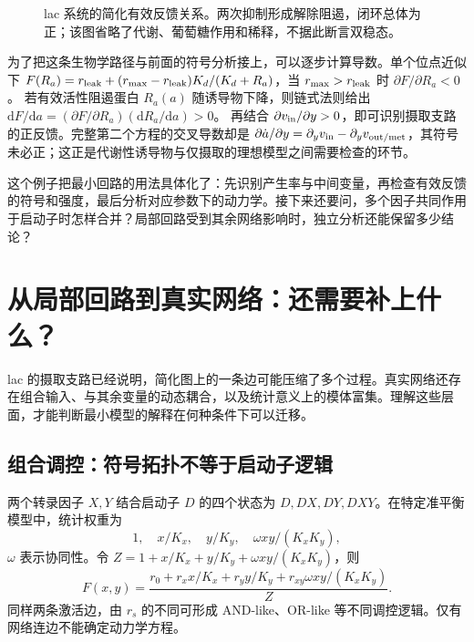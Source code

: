 \documentclass[11pt,a4paper,UTF8,fontset=fandol]{ctexart}
\newcommand{\dd}{\mathrm d}\newcommand{\R}{\mathbb R}\newcommand{\ssv}{\mathrm{ss}}
\begin{document}
\begin{figure}[H]\centering
{}
\caption{lac 系统的简化有效反馈关系。两次抑制形成解除阻遏，闭环总体为正；该图省略了代谢、葡萄糖作用和稀释，不据此断言双稳态。}
\end{figure}

为了把这条生物学路径与前面的符号分析接上，可以逐步计算导数。单个位点近似下 $F(R_a)=r_{\rm leak}+(r_{\rm max}-r_{\rm leak})K_d/(K_d+R_a)$，当 $r_{\rm max}>r_{\rm leak}$ 时 $\partial F/\partial R_a<0$。
若有效活性阻遏蛋白 $R_a(a)$ 随诱导物下降，则链式法则给出 $\dd F/\dd a=(\partial F/\partial R_a)(\dd R_a/\dd a)>0$。
再结合 $\partial v_{\rm in}/\partial y>0$，即可识别摄取支路的正反馈。完整第二个方程的交叉导数却是
$\partial\dot a/\partial y=\partial_yv_{\rm in}-\partial_yv_{\rm out/met}$，其符号未必正；这正是代谢性诱导物与仅摄取的理想模型之间需要检查的环节。

这个例子把最小回路的用法具体化了：先识别产生率与中间变量，再检查有效反馈的符号和强度，最后分析对应参数下的动力学。接下来还要问，多个因子共同作用于启动子时怎样合并？局部回路受到其余网络影响时，独立分析还能保留多少结论？

\section{从局部回路到真实网络：还需要补上什么？}
lac 的摄取支路已经说明，简化图上的一条边可能压缩了多个过程。真实网络还存在组合输入、与其余变量的动态耦合，以及统计意义上的模体富集。理解这些层面，才能判断最小模型的解释在何种条件下可以迁移。
\subsection{组合调控：符号拓扑不等于启动子逻辑}
两个转录因子 $X,Y$ 结合启动子 $D$ 的四个状态为 $D,DX,DY,DXY$。在特定准平衡模型中，统计权重为
\begin{equation}1,\quad x/K_x,\quad y/K_y,\quad\omega xy/(K_xK_y),\end{equation}
$\omega$ 表示协同性。令 $Z=1+x/K_x+y/K_y+\omega xy/(K_xK_y)$，则
\begin{equation}F(x,y)=\frac{r_0+r_xx/K_x+r_yy/K_y+r_{xy}\omega xy/(K_xK_y)}{Z}.\end{equation}
同样两条激活边，由 $r_s$ 的不同可形成 AND-like、OR-like 等不同调控逻辑。仅有网络连边不能确定动力学方程。
\end{document}
